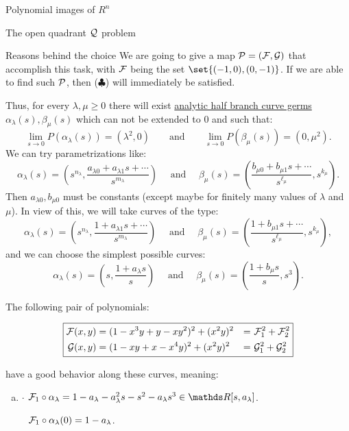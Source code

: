 \documentclass[11pt, a4paper, english, twoside, notitlepage]{report}
\begin{document}
\begin{chapter}{Polynomial images of $R^n$}
\begin{section}{The open quadrant $\Qu$ problem}
\begin{subsection}{Reasons behind the choice}
		We are going to give a map $\P = (\F , \G)$ that accomplish this task, with $\F$ being the set $\set{(-1, 0), (0, -1)}$. If we are able to find such $\P$, then ($\clubsuit$) will immediately be satisfied. 
		
		Thus, for every $\lambda, \mu \ge 0$ there will exist \hyperref[curveGerms]{analytic half branch curve germs} $\alpha_{\lambda}(s),\beta_{\mu}(s)$ which can not be extended to $0$ and such that:
		$$
		\lim_{s\rightarrow 0} P(\alpha_{\lambda}(s))=(\lambda^2,0)\qquad \text{and} \qquad
		\lim_{s\rightarrow 0} P(\beta_{\mu}(s))=(0,\mu^2).
		$$
		We can try parametrizations like:
		$$
		\alpha_{\lambda}(s)=\left(s^{n_{\lambda}},\frac{a_{\lambda 0}+a_{\lambda 1}s+\cdots}{s^{m_{\lambda}}}\right)
		\quad \text{ and } \quad
		\beta_{\mu}(s)=\left(\frac{b_{\mu 0}+b_{\mu 1}s+\cdots}{s^{\ell_{\mu}}},s^{k_{\mu}}\right).
		$$
		Then $a_{\lambda 0},b_{\mu 0}$ must be constants (except maybe for finitely many values of $\lambda$ and $\mu$). In view of this, we will take curves of the type:
		$$
		\alpha_{\lambda}(s)=\left(s^{n_{\lambda}},\frac{1+a_{\lambda 1}s+\cdots}{s^{m_{\lambda}}}\right)
		\quad \text{ and } \quad
		\beta_{\mu}(s)=\left(\frac{1+b_{\mu 1}s+\cdots}{s^{\ell_{\mu}}},s^{k_{\mu}}\right),
		$$
		and we can choose the simplest possible curves:
		$$
		\alpha_{\lambda}(s)=\left(s,\frac{1+a_{\lambda }s}{s}\right)
		\quad \text{ and } \quad
		\beta_{\mu}(s)=\left(\frac{1+b_{\mu }s}{s},s^{3}\right).
		$$
		
		The following pair of polynomials:
		
		\begin{equation*}
			\boxed{
				\begin{aligned}
					\F(x, y) & = (1 - x^3 y + y - x y^2)^2 + (x^2 y)^2 & = &\  \F_1^2 + \F_2^2 \\
					\G(x, y) & = (1 - xy + x - x^4 y)^2 + (x^2 y)^2 & = &\ \G_1^2 + \G_2^2\\
				\end{aligned}
			}
		\end{equation*}
		
		have a good behavior along these curves, meaning:
		
		\begin{enumerate}[(a)]
		
			\item $\cdot$ $\F_1 \circ \alpha_\lambda = 1 -a_{\lambda}-a_{\lambda}^{2} s-s^{2}-a_{\lambda} s^{3} \in \R[s,a_{\lambda}]$.
			
				$\ \ \F_1\circ\alpha_{\lambda }(0)=1-a_{\lambda }$.
			

\end{enumerate}
\end{subsection}
\end{section}
\end{chapter}
\end{document}
